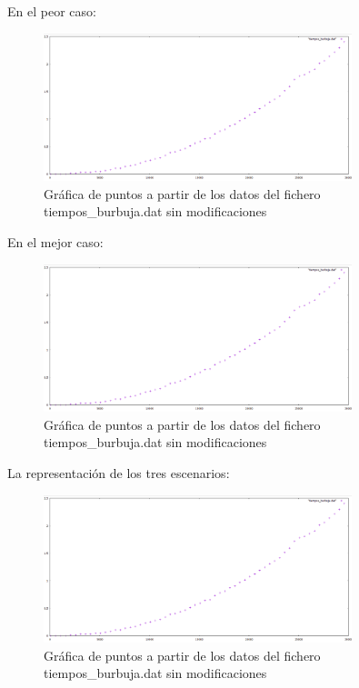 \documentclass[paper=a4, fontsize=10pt]{scrartcl} %
\begin{document}
En el peor caso:
\begin{figure}[H] %
	\centering
	\label{lsblk}
	\includegraphics[width=0.8\textwidth]{../imgs/c1.PNG}
	\caption{Gráfica de puntos a partir de los datos del fichero tiempos\_burbuja.dat sin modificaciones} 
\end{figure}

En el mejor caso:
\begin{figure}[H] %
	\centering
	\label{lsblk}
	\includegraphics[width=0.8\textwidth]{../imgs/c1.PNG}
	\caption{Gráfica de puntos a partir de los datos del fichero tiempos\_burbuja.dat sin modificaciones} 
\end{figure}

La representación de los tres escenarios:

\begin{figure}[H] %
	\centering
	\label{lsblk}
	\includegraphics[width=0.8\textwidth]{../imgs/c1.PNG}
	\caption{Gráfica de puntos a partir de los datos del fichero tiempos\_burbuja.dat sin modificaciones} 
\end{figure}
\end{document}
